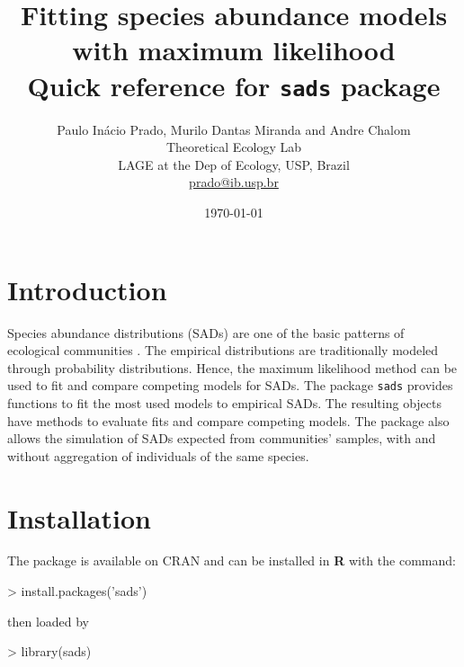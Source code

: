 \documentclass[11pt, A4]{article}
\newcommand{\R}{\textnormal{\sffamily\bfseries R}\xspace}
\newcommand{\code}[1]{\texttt{#1}}
\begin{document}
\title{Fitting species abundance models with maximum likelihood \\ Quick reference for \code{sads} package}
\author{Paulo In\'acio Prado,  Murilo Dantas Miranda and Andre Chalom \\ Theoretical Ecology Lab \\ LAGE at the Dep of Ecology, USP, Brazil \\ 
  \url{prado@ib.usp.br}}

\date{\today}

\maketitle


\section{Introduction}

Species abundance distributions (SADs) are one of the basic patterns
of ecological communities \citep{McGill2007}. 
The empirical distributions are
traditionally modeled through probability distributions. Hence, the
maximum likelihood method can be used to fit and compare competing
models for SADs. 
The package \code{sads} provides functions to fit the most used models
to empirical SADs. The resulting objects have methods to evaluate fits and compare competing
models. The package also allows the simulation of SADs expected from communities' 
samples, with and without aggregation of individuals of the same species.


\section{Installation}

The package is available on CRAN and can be installed in \R with the command:

\begin{Schunk}
\begin{Sinput}
> install.packages('sads')
\end{Sinput}
\end{Schunk}

then loaded by

\begin{Schunk}
\begin{Sinput}
> library(sads)
\end{Sinput}
\end{Schunk}
\end{document}
